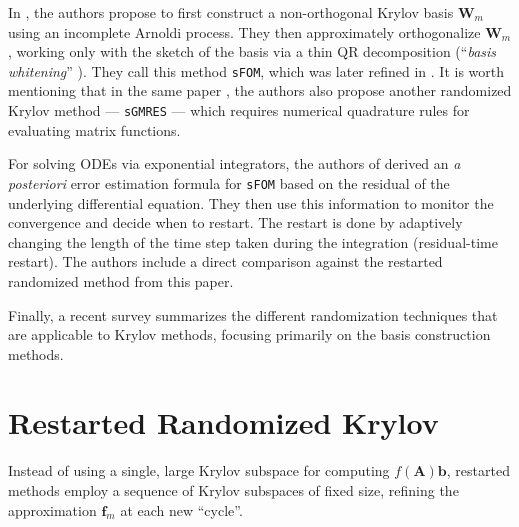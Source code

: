 \documentclass[smallextended]{svjour3}
\renewcommand{\vec}[1]{\mathbf{#1}}
\newcommand{\mat}[1]{\mathbf{#1}}
\begin{document}
In \cite{guttel_randomized_2023}, the authors propose to first construct a non-orthogonal Krylov basis $\mat{W}_m$ using an incomplete Arnoldi process. They then approximately orthogonalize $\mat{W}_m$, working only with the sketch of the basis via a thin QR decomposition (``\textit{basis whitening}'' \cite{guttel_randomized_2023,nakatsukasa_fast_2024}). They call this method \texttt{sFOM}, which was later refined in \cite{palitta_sketched_2025}. It is worth mentioning that in the same paper \cite{guttel_randomized_2023}, the authors also propose another randomized Krylov method --- \texttt{sGMRES} --- which requires numerical quadrature rules for evaluating matrix functions.

For solving ODEs via exponential integrators, the authors of \cite{krieger_general_2026} derived an \textit{a posteriori} error estimation formula for \texttt{sFOM} based on the residual of the underlying differential equation. They then use this information to monitor the convergence and decide when to restart. The restart is done by adaptively changing the length of the time step taken during the integration (residual-time restart). The authors include a direct comparison against the restarted randomized method from this paper.

Finally, a recent survey \cite{damas_randomized_2025} summarizes the different randomization techniques that are applicable to Krylov methods, focusing primarily on the basis construction methods.

\section{Restarted Randomized Krylov}
\label{sec:restart_rand_krylov}

Instead of using a single, large Krylov subspace for computing $f(\mat{A}) \vec{b}$, restarted methods \cite{afanasjew_implementation_2008,eiermann_restarted_2006,guttel_limited-memory_2020} employ a sequence of Krylov subspaces of fixed size, refining the approximation $\vec{f}_m$ at each new ``cycle''.
\end{document}
